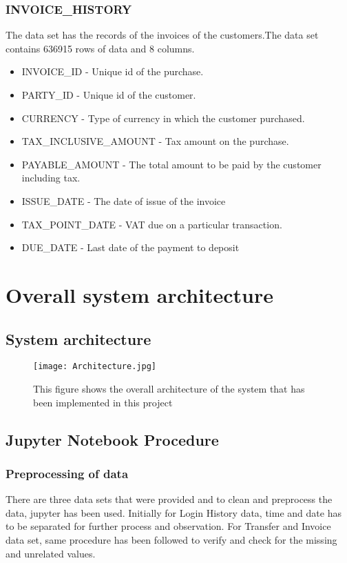 \documentclass{article}
\begin{document}
\subsubsection{INVOICE\_HISTORY}
The data set has the records of the invoices of the customers.The data set contains 636915 rows of data and 8 columns.
\begin{itemize}
    \item INVOICE\_ID - Unique id of the purchase.
    \item PARTY\_ID - Unique id of the customer.
    \item CURRENCY - Type of currency in which the customer purchased.
    \item TAX\_INCLUSIVE\_AMOUNT - Tax amount on the purchase.
    \item PAYABLE\_AMOUNT - The total amount to be paid by the customer including tax.
    \item ISSUE\_DATE - The date of issue of the invoice
    \item TAX\_POINT\_DATE - VAT due on a particular transaction.
    \item DUE\_DATE - Last date of the payment to deposit
\end{itemize}
\newpage
\section{Overall system architecture}
\subsection{System architecture}

\begin{figure}[h!]
   \centering
     \texttt{[image: Architecture.jpg]}
     \caption{This figure shows the overall architecture of the system that has been implemented in this project}
     \label{fig:universe}
\end{figure}

\newpage
\subsection{Jupyter Notebook Procedure}
\subsubsection{Preprocessing of data}
There are three data sets that were provided and to clean and preprocess the data, jupyter has been used. Initially for Login History data, time and date has to be separated for further process and observation.
For Transfer and Invoice data set, same procedure has been followed to verify and check for the missing and unrelated values.
\end{document}
